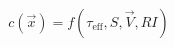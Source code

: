\documentclass[a5paper]{article}
\begin{document}
\LARGE
\pagestyle{empty}
\[
c(\vec{x})=f(\tau_\mathrm{eff},S ,\vec{V}, RI)
\]
\end{document}
